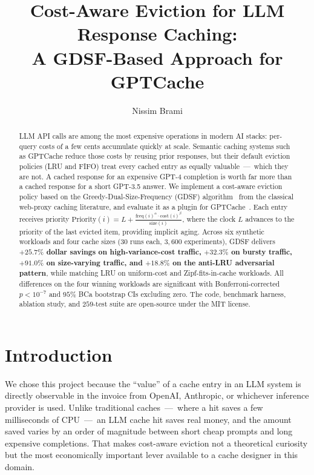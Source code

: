 \documentclass[sigconf, nonacm, review=false, screen=true]{acmart}
\title{Cost-Aware Eviction for LLM Response Caching: \\
       A GDSF-Based Approach for GPTCache}
\author{Nissim Brami}
\affiliation{%
  \institution{Ben-Gurion University of the Negev}
  \department{Department of Computer Science}
  \city{Beer-Sheva}
  \country{Israel}
}
\begin{document}
\begin{abstract}
LLM API calls are among the most expensive operations in modern AI stacks:
per-query costs of a few cents accumulate quickly at scale. Semantic caching
systems such as GPTCache reduce those costs by reusing prior responses, but
their default eviction policies (LRU and FIFO) treat every cached entry as
equally valuable~---~which they are not. A cached response for an expensive
GPT-4 completion is worth far more than a cached response for a short
GPT-3.5 answer. We implement a cost-aware eviction policy based on the
Greedy-Dual-Size-Frequency (GDSF) algorithm~\cite{cherkasova1998gdsf,
cao1997costaware} from the classical web-proxy caching literature, and
evaluate it as a plugin for GPTCache~\cite{gptcache}. Each entry receives
priority $\text{Priority}(i) = L + \tfrac{\text{freq}(i)^\alpha \cdot
\text{cost}(i)^\beta}{\text{size}(i)}$, where the clock $L$ advances to the
priority of the last evicted item, providing implicit aging. Across six
synthetic workloads and four cache sizes ($30$ runs each, $3{,}600$
experiments), GDSF delivers \textbf{$+25.7\%$ dollar savings on
high-variance-cost traffic, $+32.3\%$ on bursty traffic, $+91.0\%$ on
size-varying traffic, and $+18.8\%$ on the anti-LRU adversarial pattern},
while matching LRU on uniform-cost and Zipf-fits-in-cache workloads. All
differences on the four winning workloads are significant with
Bonferroni-corrected $p < 10^{-7}$ and $95\%$ BCa bootstrap CIs excluding
zero. The code, benchmark harness, ablation study, and $259$-test suite are
open-source under the MIT license.
\end{abstract}

\maketitle

\section{Introduction}
\label{sec:intro}

We chose this project because the ``value'' of a cache entry in an LLM
system is directly observable in the invoice from OpenAI, Anthropic, or
whichever inference provider is used. Unlike traditional caches~---~where a
hit saves a few milliseconds of CPU~---~an LLM cache hit saves real money,
and the amount saved varies by an order of magnitude between short cheap
prompts and long expensive completions. That makes cost-aware eviction not
a theoretical curiosity but the most economically important lever
available to a cache designer in this domain.
\end{document}
